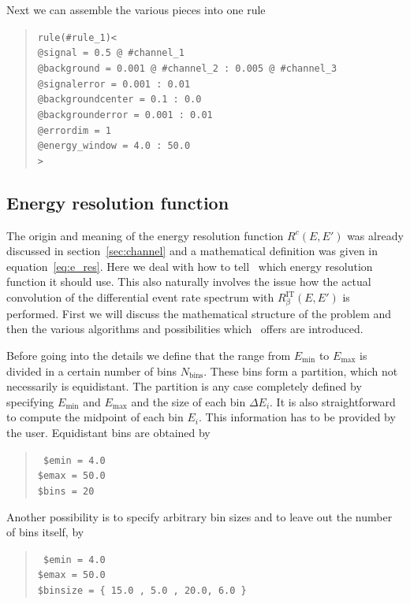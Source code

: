 Next we can assemble the various pieces into one rule
\begin{quote}
{\tt rule(\#rule\_1)<\\
\tb @signal = 0.5 @ \#channel\_1\\
\tb @background = 0.001 @ \#channel\_2 :  0.005 @ \#channel\_3\\
\tb @signalerror =       0.001  :       0.01\\
\tb @backgroundcenter =  0.1 :       0.0\\
\tb @backgrounderror =   0.001 :       0.01\\
\tb @errordim = 1\\
\tb @energy\_window = 4.0 : 50.0\\ 
>}
\end{quote}

\subsection{Energy resolution function}
\label{sec:energy}

The origin and meaning of the energy resolution function 
$R^c(E,E')$ was already discussed in 
section~\ref{sec:channel} and  a mathematical definition
was given in equation~\ref{eq:e_res}. Here we deal with
how to tell \GLOBES\ which energy resolution function it should
use. This also naturally involves the issue how the actual convolution
of the differential event rate spectrum with $R_\beta^{\text{IT}}(E,E')$
is performed. First we will discuss the mathematical structure of
the problem and then the various algorithms and possibilities which
\GLOBES\ offers are introduced. 


Before going into the details we define that the range from $E_\mathrm{min}$
to $E_\mathrm{max}$ is divided in a certain number of bins $N_\mathrm{bins}$.
These bins form a partition, which not necessarily is equidistant. The 
partition is any case completely defined by specifying $E_\mathrm{min}$
and $E_\mathrm{max}$ and the size of each bin  $\Delta E_i$. It is also
straightforward to compute the midpoint of each bin $E_i$. This information
has to be provided by the user. Equidistant bins are obtained by
\begin{quote}
{\tt
\$emin = 4.0\\
\$emax = 50.0\\
\$bins = 20
}
\end{quote}
Another possibility is to specify arbitrary bin sizes and to leave out
the number of bins itself, by
\begin{quote}
{\tt
\$emin = 4.0\\
\$emax = 50.0\\
\$binsize = \{  15.0 , 5.0 , 20.0, 6.0 \} 
}
\end{quote}
 
